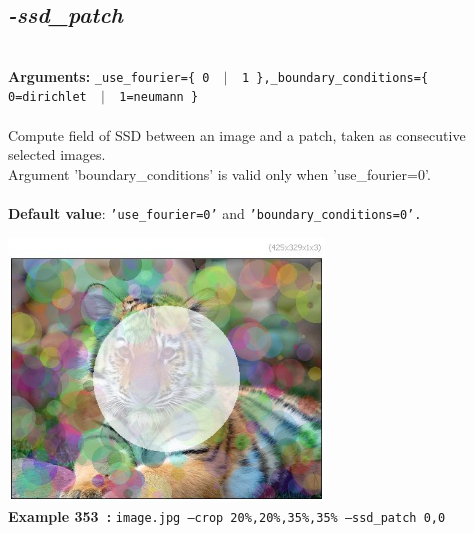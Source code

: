 \documentclass[a4paper,11pt,twoside]{book}
\begin{document}
\subsection{\emph{-ssd\_patch} }\vspace*{-0.5em}
~\\\textbf{Arguments: } 
{\small \texttt{\_use\_fourier=\{ 0 ~$|$~ 1 \},\_boundary\_conditions=\{ 0=dirichlet ~$|$~ 1=neumann \}}}\\~\\
Compute field of SSD between an image and a patch, taken as consecutive selected images.
~\\Argument 'boundary\_conditions' is valid only when 'use\_fourier=0'.
~\\~\\\textbf{Default value}: {\small \texttt{'use\_fourier=0'} and \texttt{'boundary\_conditions=0'.}}
\begin{center}\includegraphics[keepaspectratio=true,height=7cm,width=\textwidth]{img/gmic_def353.jpg}\\
{\footnotesize \textbf{Example 353~:} \texttt{image.jpg --crop 20\%,20\%,35\%,35\% --ssd\_patch 0,0}}
\end{center}
\end{document}
